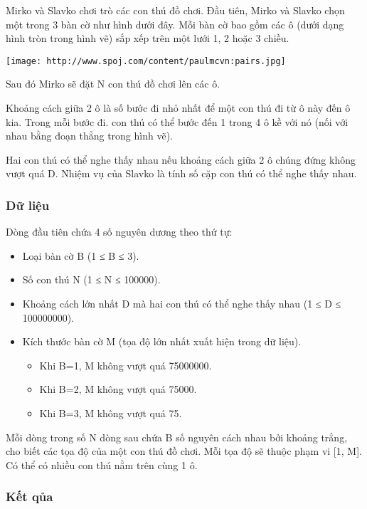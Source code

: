 







   Mirko và Slavko chơi trò các con thú đồ chơi. Đầu tiên, Mirko và Slavko chọn một trong 3 bàn cờ như hình dưới đây. Mỗi bàn cờ bao gồm các ô (dưới dạng hình tròn trong hình vẽ) sắp xếp trên một lưới 1, 2 hoặc 3 chiều.  


\texttt{[image: http://www.spoj.com/content/paulmcvn:pairs.jpg]}

   Sau đó Mirko sẽ đặt N con thú đồ chơi lên các ô.  

   Khoảng cách giữa 2 ô là số bước đi nhỏ nhất để một con thú đi từ ô này đến ô kia. Trong mỗi bước đi. con thú có thể bước đến 1 trong 4 ô kề với nó (nối với nhau bằng đoạn thẳng trong hình vẽ).  

   Hai con thú có thể nghe thấy nhau nếu khoảng cách giữa 2 ô chúng đứng không vượt quá D. Nhiệm vụ của Slavko là tính số cặp con thú có thể nghe thấy nhau.  

\subsubsection{   Dữ liệu  }

   Dòng đầu tiên chứa 4 số nguyên dương theo thứ tự:  
\begin{itemize}
	\item     Loại bàn cờ B (1 ≤ B ≤ 3).   
	\item     Số con thú N (1 ≤ N ≤ 100000).   
	\item     Khoảng cách lớn nhất D mà hai con thú có thể nghe thấy nhau (1 ≤ D ≤ 100000000).   
	\item     Kích thước bàn cờ M (tọa độ lớn nhất xuất hiện trong dữ liệu).    
\begin{itemize}
	\item       Khi B=1, M không vượt quá 75000000.     
	\item       Khi B=2, M không vượt quá 75000.     
	\item       Khi B=3, M không vượt quá 75.     
\end{itemize}
\end{itemize}

   Mỗi dòng trong số N dòng sau chứa B số nguyên cách nhau bởi khoảng trắng, cho biết các tọa độ của một con thú đồ chơi. Mỗi tọa độ sẽ thuộc phạm vi [1, M]. Có thể có nhiều con thú nằm trên cùng 1 ô.  

\subsubsection{   Kết qủa  }

